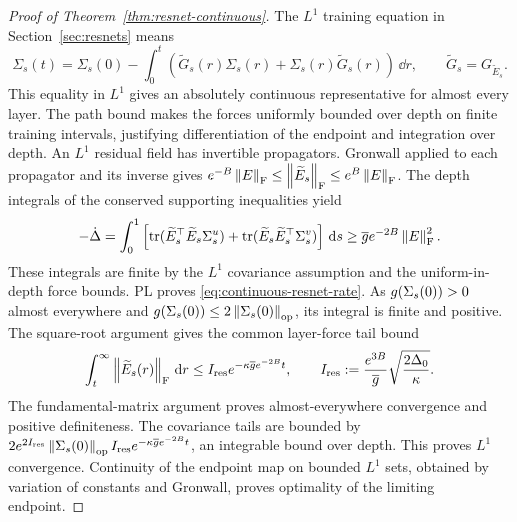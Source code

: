 \begin{proof}[Proof of Theorem~\ref{thm:resnet-continuous}]
The $L^1$ training equation in Section~\ref{sec:resnets} means
\begin{equation}\label{eq:resnet-integral}
 \Sigma_s(t)=\Sigma_s(0)-\int_0^t
 (\widetilde G_s(r)\Sigma_s(r)+\Sigma_s(r)\widetilde G_s(r))\,\dd r,
 \qquad\widetilde G_s=G_{\widetilde E_s}.
\end{equation}
This equality in $L^1$ gives an absolutely continuous representative for
almost every layer. The path bound makes the forces uniformly bounded
over depth on finite training intervals, justifying differentiation
of the endpoint and integration over depth.
An $L^1$ residual field has invertible propagators. Gronwall applied to
each propagator and its inverse gives
$e^{-B}\left\lVert E \right\rVert_{\mathrm{F}}\le\left\lVert \widetilde E_s \right\rVert_{\mathrm{F}}\le e^B\left\lVert E \right\rVert_{\mathrm{F}}$.
The depth integrals of the conserved supporting inequalities yield
\[
 -\dot\Delta
 =\int_0^1\left[\operatorname{tr}(\widetilde E_s^\top \widetilde E_s\Sigma^u_s)
                    +\operatorname{tr}(\widetilde E_s\widetilde E_s^\top\Sigma^v_s)\right]\,\mathrm{d} s
 \ge\overline g e^{-2B}\left\lVert E \right\rVert_{\mathrm{F}}^2.
\]
These integrals are finite by the $L^1$ covariance assumption and the
uniform-in-depth force bounds. PL proves \eqref{eq:continuous-resnet-rate}.
As $g(\Sigma_s(0))>0$ almost everywhere and
$g(\Sigma_s(0))\le2\left\lVert \Sigma_s(0) \right\rVert_{\mathrm{op}}$, its integral is finite and positive.
The square-root argument gives the common layer-force tail bound
\[
 \int_t^\infty\left\lVert \widetilde E_s(r) \right\rVert_{\mathrm{F}}\,\mathrm{d} r
 \le I_{\rm res}e^{-\kappa\overline g e^{-2B}t},\qquad
 I_{\rm res}:=\frac{e^{3B}}{\overline g}
                         \sqrt{\frac{2\Delta_0}{\kappa}}.
\]
The fundamental-matrix argument proves almost-everywhere convergence
and positive definiteness. The covariance tails are bounded by
$2e^{2I_{\rm res}}\left\lVert \Sigma_s(0) \right\rVert_{\mathrm{op}}I_{\rm res}
e^{-\kappa\overline g e^{-2B}t}$, an integrable bound over depth.
This proves $L^1$ convergence. Continuity of the endpoint map on bounded
$L^1$ sets, obtained by variation of constants and Gronwall, proves
optimality of the limiting endpoint.
\end{proof}

